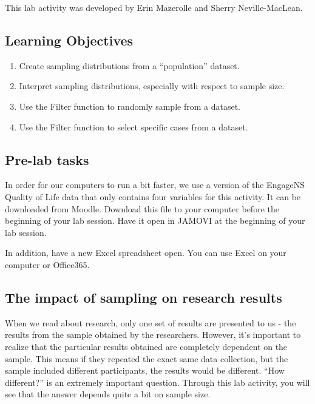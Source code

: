 \documentclass[
]{book}
\providecommand{\tightlist}{%
  \setlength{\itemsep}{0pt}\setlength{\parskip}{0pt}}
\begin{document}
This lab activity was developed by Erin Mazerolle and Sherry Neville-MacLean.

\hypertarget{learning-objectives}{%
\subsection{Learning Objectives}\label{learning-objectives}}

\begin{enumerate}
\def\labelenumi{\arabic{enumi}.}
\tightlist
\item
  Create sampling distributions from a ``population'' dataset.
\item
  Interpret sampling distributions, especially with respect to sample size.
\item
  Use the {Filter} function to randomly sample from a dataset.
\item
  Use the {Filter} function to select specific cases from a dataset.
\end{enumerate}

\hypertarget{pre-lab-tasks}{%
\subsection{Pre-lab tasks}\label{pre-lab-tasks}}

In order for our computers to run a bit faster, we use a version of the EngageNS Quality of Life data that only contains four variables for this activity. It can be downloaded from Moodle. Download this file to your computer before the beginning of your lab session. Have it open in JAMOVI at the beginning of your lab session.

In addition, have a new Excel spreadsheet open. You can use Excel on your computer or Office365.

\hypertarget{the-impact-of-sampling-on-research-results}{%
\subsection{The impact of sampling on research results}\label{the-impact-of-sampling-on-research-results}}

When we read about research, only one set of results are presented to us - the results from the sample obtained by the researchers. However, it's important to realize that the particular results obtained are completely dependent on the sample. This means if they repeated the exact same data collection, but the sample included different participants, the results would be different. ``How different?'' is an extremely important question. Through this lab activity, you will see that the answer depends quite a bit on sample size.
\end{document}
